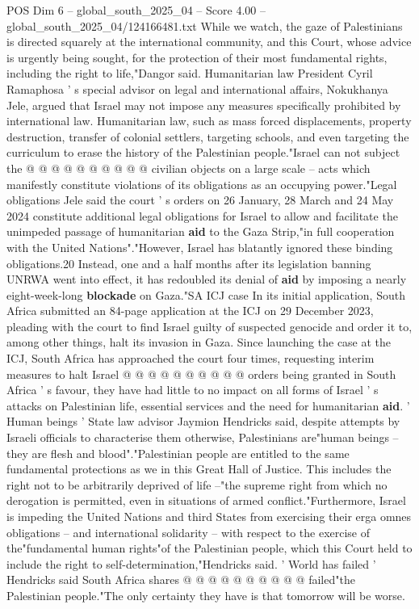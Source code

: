 \begin{textsample}{POS Dim 6 – global\_south\_2025\_04 – Score 4.00 – global\_south\_2025\_04/124166481.txt}
While we watch, the gaze of Palestinians is directed squarely at the international community, and this Court, whose advice is urgently being sought, for the protection of their most fundamental rights, including the right to life,"Dangor said.
Humanitarian law President Cyril Ramaphosa ' s special advisor on legal and international affairs, Nokukhanya Jele, argued that Israel may not impose any measures specifically prohibited by international law.
Humanitarian law, such as mass forced displacements, property destruction, transfer of colonial settlers, targeting schools, and even targeting the curriculum to erase the history of the Palestinian people."Israel can not subject the @ @ @ @ @ @ @ @ @ @ civilian objects on a large scale -- acts which manifestly constitute violations of its obligations as an occupying power."Legal obligations Jele said the court ' s orders on 26 January, 28 March and 24 May 2024 constitute additional legal obligations for Israel to allow and facilitate the unimpeded passage of humanitarian \textbf{aid} to the Gaza Strip,"in full cooperation with the United Nations"."However, Israel has blatantly ignored these binding obligations.20 Instead, one and a half months after its legislation banning UNRWA went into effect, it has redoubled its denial of \textbf{aid} by imposing a nearly eight-week-long \textbf{blockade} on Gaza."SA ICJ case In its initial application, South Africa submitted an 84-page application at the ICJ on 29 December 2023, pleading with the court to find Israel guilty of suspected genocide and order it to, among other things, halt its invasion in Gaza.
Since launching the case at the ICJ, South Africa has approached the court four times, requesting interim measures to halt Israel @ @ @ @ @ @ @ @ @ @ orders being granted in South Africa ' s favour, they have had little to no impact on all forms of Israel ' s attacks on Palestinian life, essential services and the need for humanitarian \textbf{aid}. ' Human beings ' State law advisor Jaymion Hendricks said, despite attempts by Israeli officials to characterise them otherwise, Palestinians are"human beings -- they are flesh and blood"."Palestinian people are entitled to the same fundamental protections as we in this Great Hall of Justice.
This includes the right not to be arbitrarily deprived of life --"the supreme right from which no derogation is permitted, even in situations of armed conflict."Furthermore, Israel is impeding the United Nations and third States from exercising their erga omnes obligations -- and international solidarity -- with respect to the exercise of the"fundamental human rights"of the Palestinian people, which this Court held to include the right to self-determination,"Hendricks said. ' World has failed ' Hendricks said South Africa shares @ @ @ @ @ @ @ @ @ @ failed"the Palestinian people."The only certainty they have is that tomorrow will be worse.

\end{textsample}
